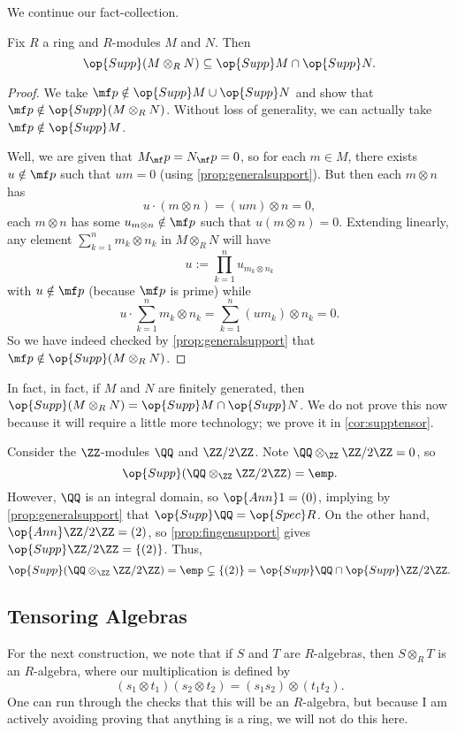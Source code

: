 We continue our fact-collection.
\begin{proposition}
	Fix $R$ a ring and $R$-modules $M$ and $N$. Then
	\[\op{Supp}(M\otimes_RN)\subseteq\op{Supp}M\cap\op{Supp}N.\]
\end{proposition}
\begin{proof}
	We take $\mf p\notin\op{Supp}M\cup\op{Supp}N$ and show that $\mf p\notin\op{Supp}(M\otimes_RN)$. Without loss of generality, we can actually take $\mf p\notin\op{Supp}M$.

	Well, we are given that $M_\mf p=N_\mf p=0$, so for each $m\in M$, there exists $u\notin\mf p$ such that $um=0$ (using \autoref{prop:generalsupport}). But then each $m\otimes n$ has
	\[u\cdot(m\otimes n)=(um)\otimes n=0,\]
	each $m\otimes n$ has some $u_{m\otimes n}\notin\mf p$ such that $u(m\otimes n)=0$. Extending linearly, any element $\sum_{k=1}^nm_k\otimes n_k$ in $M\otimes_RN$ will have
	\[u:=\prod_{k=1}^nu_{m_k\otimes n_k}\]
	with $u\notin\mf p$ (because $\mf p$ is prime) while
	\[u\cdot\sum_{k=1}^nm_k\otimes n_k=\sum_{k=1}^n(um_k)\otimes n_k=0.\]
	So we have indeed checked by \autoref{prop:generalsupport} that $\mf p\notin\op{Supp}(M\otimes_RN)$.
\end{proof}
\begin{remark} \label{rem:supptensor}
	In fact, in fact, if $M$ and $N$ are finitely generated, then $\op{Supp}(M\otimes_RN)=\op{Supp}M\cap\op{Supp}N$. We do not prove this now because it will require a little more technology; we prove it in \autoref{cor:supptensor}.
\end{remark}
\begin{ex}
	Consider the $\ZZ$-modules $\QQ$ and $\ZZ/2\ZZ$. Note $\QQ\otimes_\ZZ\ZZ/2\ZZ=0$, so
	\[\op{Supp}(\QQ\otimes_\ZZ\ZZ/2\ZZ)=\emp.\]
	However, $\QQ$ is an integral domain, so $\op{Ann}1=(0)$, implying by \autoref{prop:generalsupport} that $\op{Supp}\QQ=\op{Spec}R$. On the other hand, $\op{Ann}\ZZ/2\ZZ=(2)$, so \autoref{prop:fingensupport} gives $\op{Supp}\ZZ/2\ZZ=\{(2)\}$. Thus,
	\[\op{Supp}(\QQ\otimes_\ZZ\ZZ/2\ZZ)=\emp\subsetneq\{(2)\}=\op{Supp}\QQ\cap\op{Supp}\ZZ/2\ZZ.\]
\end{ex}

\subsection{Tensoring Algebras}
For the next construction, we note that if $S$ and $T$ are $R$-algebras, then $S\otimes_RT$ is an $R$-algebra, where our multiplication is defined by
\[(s_1\otimes t_1)(s_2\otimes t_2)=(s_1s_2)\otimes(t_1t_2).\]
One can run through the checks that this will be an $R$-algebra, but because I am actively avoiding proving that anything is a ring, we will not do this here.

